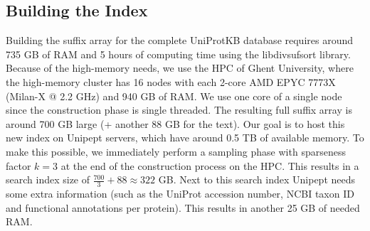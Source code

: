 \documentclass[10pt]{article}
\newenvironment{Figure}
{\par\medskip\noindent\minipage{\linewidth}}
{\endminipage\par\medskip}
\begin{document}
\begin{multicols}{2}
        \subsection{Building the Index}
        Building the suffix array for the complete UniProtKB database requires around 735 GB of RAM and 5 hours of computing time using the libdivsufsort library.
        Because of the high-memory needs, we use the HPC of Ghent University, where the high-memory cluster has 16 nodes with each 2-core AMD EPYC 7773X (Milan-X @ 2.2 GHz) and 940 GB of RAM\@.
        We use one core of a single node since the construction phase is single threaded.
        The resulting full suffix array is around 700 GB large (+ another 88 GB for the text).
        Our goal is to host this new index on Unipept servers, which have around 0.5 TB of available memory.
        To make this possible, we immediately perform a sampling phase with sparseness factor $k = 3$ at the end of the construction process on the HPC\@.
        This results in a search index size of $\frac{700}{3} + 88 \approx 322$ GB\@.
        Next to this search index Unipept needs some extra information (such as the UniProt accession number, NCBI taxon ID and functional annotations per protein).
        This results in another 25 GB of needed RAM\@.

        \begin{Figure}
            \centering
            \label{fig:uniprot_memory_treemap}
        \end{Figure}


\end{multicols}
\end{document}
